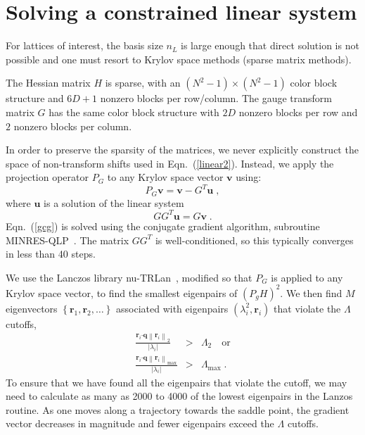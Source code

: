 \documentclass[preprint,aps,prd]{revtex4-2}
\newcommand{\be}{\begin{equation}}
\newcommand{\eq}{\end{equation}}
\begin{document}
\section{Solving a constrained linear system}
\label{krylov}

For lattices of interest, the basis size $n_L$ is large enough
that direct solution is not possible and one must resort to Krylov
space methods (sparse matrix methods).

The Hessian matrix $H$ is sparse, with an $(N^2-1)\times(N^2-1)$
color block structure and $6D+1$ nonzero blocks per row/column.
The gauge transform matrix $G$ has the same color block structure
with $2 D$ nonzero blocks per row and $2$ nonzero blocks per column.

In order to preserve the sparsity of the matrices, we never
explicitly construct the space of non-transform shifts used in
Eqn.~(\ref{linear2}).  Instead, we apply the projection
operator $P_G$ to any Krylov space vector $\mathbf{v}$ using:
\be
    P_G \mathbf{v} = \mathbf{v} - G^T \mathbf{u} \; ,
\eq
where $\mathbf{u}$ is a solution of the linear system
\be
  G G^T \mathbf{u} = G \mathbf{v} \; .\label{gcg}
\eq
Eqn.~(\ref{gcg}) is solved using the conjugate gradient
algorithm, subroutine MINRES-QLP~\cite{choi_algorithm_2014}.
The matrix $G G^T$ is well-conditioned, so this typically converges
in less than 40 steps.

We use the Lanczos library nu-TRLan~\cite{yamazaki_adaptive_2010},
modified so that $P_G$ is applied to any Krylov space vector, to
find the smallest eigenpairs of $\left(P_g H\right)^2$.  We then find
$M$ eigenvectors $\left\{\mathbf{r}_1, \mathbf{r}_2, \ldots\right\}$
associated with eigenpairs $\left(\lambda_i^2, \mathbf{r}_i\right)$
that violate the $\Lambda$ cutoffs,
\begin{eqnarray}
   \frac{ \mathbf{r}_i \mathbf{\cdot} \mathbf{q}
   \left\lVert \mathbf{r}_i\right\rVert_2}{\left|\lambda_i\right| }
     &>& \Lambda_2  \quad\mbox{or} \\
   \frac{ \mathbf{r}_i\mathbf{\cdot} \mathbf{q}
   \left\lVert \mathbf{r}_i\right\rVert_\mathrm{max}}{\left|\lambda_i\right| }
     &>& \Lambda_\mathrm{max} \; .
\end{eqnarray}
To ensure that we have found all the eigenpairs that violate the cutoff,
we may need to calculate as many as 2000 to 4000 of the lowest eigenpairs
in the Lanzos routine.  As one moves along a trajectory towards the
saddle point, the gradient vector decreases in magnitude and fewer eigenpairs
exceed the $\Lambda$ cutoffs.
\end{document}
